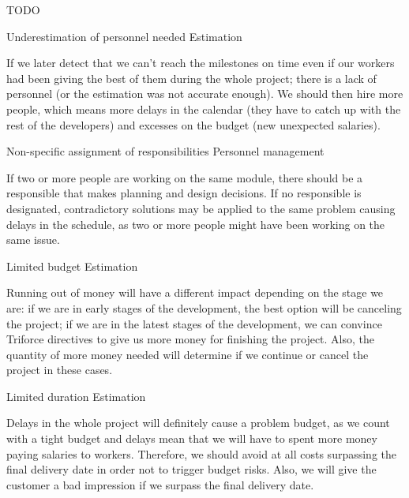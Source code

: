 TODO
\begin{risk}{Underestimation of personnel needed}
\riskcat Estimation

If we later detect that we can't reach the milestones on time even if our workers had been giving the best of them during the whole project; there is a lack of personnel (or the estimation was not accurate enough). We should then hire more people, which means more delays in the calendar (they have to catch up with the rest of the developers) and excesses on the budget (new unexpected salaries).
\end{risk}

\begin{risk}{Non-specific assignment of responsibilities}
\riskcat Personnel management

If two or more people are working on the same module, there should be a responsible that makes planning and design decisions. If no responsible is designated, contradictory solutions may be applied to the same problem causing delays in the schedule, as two or more people might have been working on the same issue.
\end{risk}

\begin{risk}{Limited budget}
\riskcat Estimation

Running out of money will have a different impact depending on the stage we are: if we are in early stages of the development, the best option will be canceling the project; if we are in the latest stages of the development, we can convince Triforce directives to give us more money for finishing the project. Also, the quantity of more money needed will determine if we continue or cancel the project in these cases.
\end{risk}

\begin{risk}{Limited duration}
\riskcat Estimation

Delays in the whole project will definitely cause a problem budget, as we count with a tight budget and delays mean that we will have to spent more money paying salaries to workers. Therefore, we should avoid at all costs surpassing the final delivery date in order not to trigger budget risks. Also, we will give the customer a bad impression if we surpass the final delivery date.
\end{risk}
